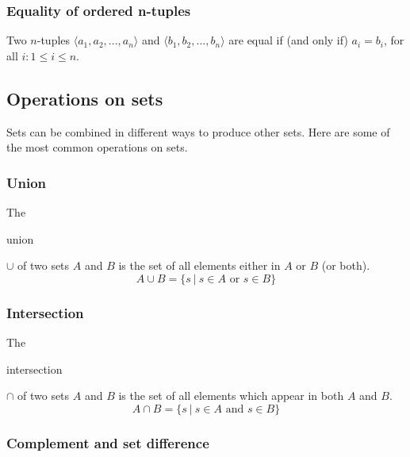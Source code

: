 \documentclass[11pt]{article}
\theoremstyle{plain}
\theoremstyle{definition}
\begin{document}
\subsubsection*{Equality of ordered n-tuples}

Two $ n $-tuples $ \langle a_1, a_2, ..., a_n \rangle $ and $ \langle b_1, b_2, ..., b_n \rangle $ are equal if (and only if) $ a_i = b_i $, for all $ i : 1 \le i \le n $.

\subsection*{Operations on sets}

Sets can be combined in different ways to produce other sets. Here are some of the most common operations on sets.

\subsubsection*{Union}

\begin{center}
  \def\svgwidth{0.3\columnwidth}
  
\end{center}

\noindent The \begin{em}union\end{em} $ \cup $ of two sets $ A $ and $ B $ is the set of all elements either in $ A $ or $ B $ (or both). 
$$ 
A \cup B = \{ s \ | \ s \in A \text{ or } s \in B \} 
$$

\subsubsection*{Intersection}

\begin{center}
  \def\svgwidth{0.3\columnwidth}
  
\end{center}

\noindent The \begin{em}intersection\end{em} $ \cap $ of two sets $ A $ and $ B $ is the set of all elements which appear in both $ A $ and $ B $. 
$$
A \cap B = \{ s \ | \ s \in A \text{ and } s \in B \} 
$$

\subsubsection*{Complement and set difference}
\end{document}
